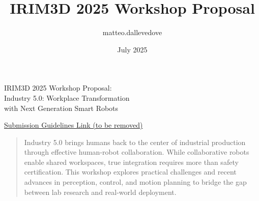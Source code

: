 \documentclass{article}
\title{IRIM3D 2025 Workshop Proposal}
\author{matteo.dallevedove }
\date{July 2025}
\begin{document}
\begin{center}
    {\Large IRIM3D 2025 Workshop Proposal:} \vspace{5mm} \\
    {\LARGE  Industry 5.0: Workplace Transformation \\ with Next Generation Smart Robots}
\end{center}

\noindent
\href{https://i-rim.it/wp-content/uploads/2025/06/Call-for-workshops-I-RIM-3D-2025.pdf}{Submission Guidelines Link (to be removed)}

\begin{quote}
    Industry 5.0 brings humans back to the center of industrial production through effective human-robot collaboration.
    While collaborative robots enable shared workspaces, true integration requires more than safety certification. 
    This workshop explores practical challenges and recent advances in perception, control, and motion planning to bridge the gap between lab research and real-world deployment.
\end{quote}
\end{document}
